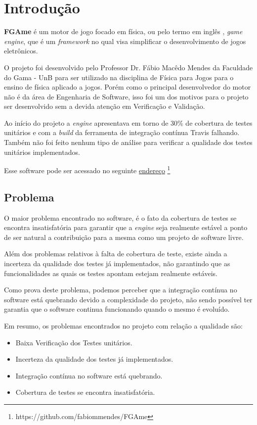 \chapter[Introdução]{Introdução}
\textbf{FGAme} é um motor de jogo focado em física, ou pelo termo em inglês , \textit{game} \textit{engine}, que é um \textit{framework} no qual visa simplificar o desenvolvimento de jogos eletrônicos.

O projeto foi desenvolvido pelo Professor Dr. Fábio Macêdo Mendes da Faculdade do Gama - UnB para ser utilizado na disciplina de Física para Jogos para o ensino de física aplicado a jogos. Porém como o principal desenvolvedor do motor não é da área de Engenharia de Software, isso foi um dos motivos para o projeto ser desenvolvido sem a devida atenção em Verificação e Validação.

Ao início do projeto a \textit{engine} apresentava em torno de 30\% de cobertura de testes unitários e com a \textit{build} da ferramenta de integração contínua Travis falhando. Também não foi feito nenhum tipo de análise para verificar a qualidade dos testes unitários implementados.



Esse software pode ser acessado no seguinte \href{https://github.com/fabiommendes/FGAme}{endereço}%
\footnote{https://github.com/fabiommendes/FGAme}

\section{Problema}

O maior problema encontrado no software, é o fato da cobertura de testes se encontra insatisfatória para garantir que a \textit{engine} seja realmente estável a ponto de ser natural a contribuição para a mesma como um projeto de software livre.
    
Além dos problemas relativos à falta de cobertura de teste, existe ainda a incerteza da qualidade dos testes já implementados, não garantindo que as funcionalidades as quais os testes apontam estejam realmente estáveis.

Como prova deste problema, podemos perceber que a integração contínua no software está quebrando devido a complexidade do projeto, não sendo possível ter garantia que o software continua funcionando quando o mesmo é evoluído.

Em resumo, os problemas encontrados no projeto com relação a qualidade são:
\begin{itemize}
\item Baixa Verificação dos Testes unitários.
\item Incerteza da qualidade dos testes já implementados.
\item Integração contínua no software está quebrando.
\item Cobertura de testes se encontra insatisfatória.
\end{itemize}


